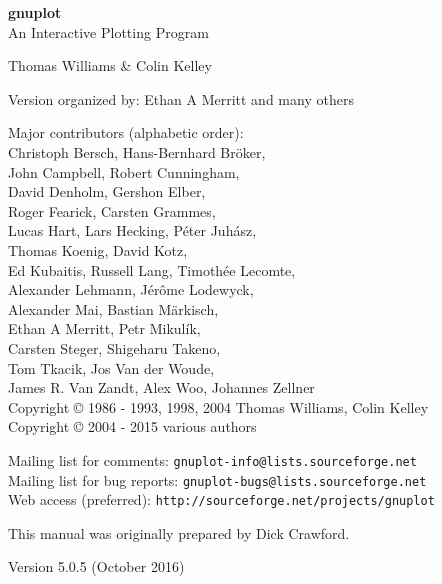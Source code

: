 \documentclass[twoside]{article}
\def\gnuplotVersion{\usebox\GpVersion}
\begin{document}
\sloppy
\thispagestyle{empty}
\rule{0in}{1.0in}

  \begin{center}

  {\huge\bf {gnuplot \gpVersion}}\\
  \vspace{3ex}
  {\Large An Interactive Plotting Program}\\

  \vspace{2ex}

  \large
  Thomas Williams \& Colin Kelley\\

  \vspace{2ex}

  Version
    \gnuplotVersion
  organized by: Ethan A Merritt and many others\\

   \vspace{2ex}

  Major contributors (alphabetic order):\\

  Christoph Bersch,
  Hans-Bernhard Bröker,\\
  John Campbell,
  Robert Cunningham,\\
  David Denholm,
  Gershon Elber,\\
  Roger Fearick,
  Carsten Grammes,\\
  Lucas Hart,
  Lars Hecking,
  Péter Juhász,\\
  Thomas Koenig,
  David Kotz,\\
  Ed Kubaitis,
  Russell Lang,
  Timothée Lecomte,\\
  Alexander Lehmann,
  Jérôme Lodewyck,\\
  Alexander Mai,
  Bastian Märkisch, \\
  Ethan A Merritt,
  Petr Mikulík,\\
  Carsten Steger,
  Shigeharu Takeno,\\
  Tom Tkacik,
  Jos Van der Woude,\\
  James R. Van Zandt,
  Alex Woo,
  Johannes Zellner\\
  Copyright {\copyright} 1986 - 1993, 1998, 2004   Thomas Williams, Colin Kelley\\
  Copyright {\copyright} 2004 - 2015  various authors\\

  \vspace{2ex}

  Mailing list for comments: \verb+gnuplot-info@lists.sourceforge.net+\\
  Mailing list for bug reports: \verb+gnuplot-bugs@lists.sourceforge.net+\\
  Web access (preferred): \verb+http://sourceforge.net/projects/gnuplot+

  \vfill
  This manual was originally prepared by Dick Crawford. \\

  \vspace{2ex}

   Version 5.0.5 (October 2016)

   \end{center}
\newpage


\hypertarget{TableOfContents}{}
\tableofcontents

\newpage
\end{document}
